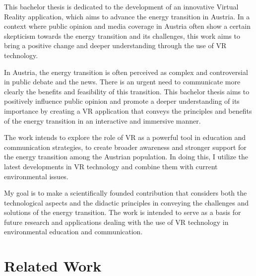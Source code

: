 \documentclass[draft, final]{vutinfth} %
\begin{document}




This bachelor thesis is dedicated to the development of an innovative Virtual Reality application, which aims to advance the energy transition in Austria. In a context where public opinion and media coverage in Austria often show a certain skepticism towards the energy transition and its challenges, this work aims to bring a positive change and deeper understanding through the use of VR technology.

In Austria, the energy transition is often perceived as complex and controversial in public debate and the news. There is an urgent need to communicate more clearly the benefits and feasibility of this transition. This bachelor thesis aims to positively influence public opinion and promote a deeper understanding of its importance by creating a VR application that conveys the principles and benefits of the energy transition in an interactive and immersive manner.

The work intends to explore the role of VR as a powerful tool in education and communication strategies, to create broader awareness and stronger support for the energy transition among the Austrian population. In doing this, I utilize the latest developments in VR technology and combine them with current environmental issues.

My goal is to make a scientifically founded contribution that considers both the technological aspects and the didactic principles in conveying the challenges and solutions of the energy transition. The work is intended to serve as a basis for future research and applications dealing with the use of VR technology in environmental education and communication.






\chapter{Related Work}

\end{document}
